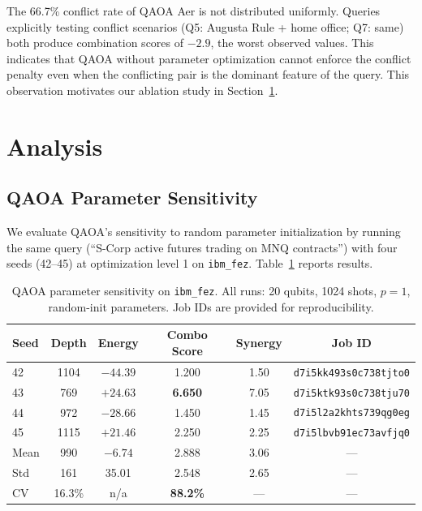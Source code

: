 \documentclass{article}
\begin{document}
The 66.7\% conflict rate of QAOA Aer is not distributed uniformly.
Queries explicitly testing conflict scenarios (Q5: Augusta Rule +
home office; Q7: same) both produce combination scores of $-2.9$,
the worst observed values. This indicates that QAOA without parameter
optimization cannot enforce the conflict penalty even when the
conflicting pair is the dominant feature of the query. This observation
motivates our ablation study in Section~\ref{sec:analysis}.

\section{Analysis}
\label{sec:analysis}

\subsection{QAOA Parameter Sensitivity}

We evaluate QAOA's sensitivity to random parameter initialization by
running the same query (``S-Corp active futures trading on MNQ
contracts'') with four seeds (42–45) at optimization level 1 on
\texttt{ibm\_fez}. Table~\ref{tab:sensitivity} reports results.

\begin{table}[h]
\centering
\caption{QAOA parameter sensitivity on \texttt{ibm\_fez}.
All runs: 20 qubits, 1024 shots, $p=1$, random-init parameters.
Job IDs are provided for reproducibility.}
\label{tab:sensitivity}
\small
\begin{tabular}{lccccc}
\toprule
Seed & Depth & Energy & Combo Score & Synergy & Job ID \\
\midrule
42 & 1104 & $-44.39$ & 1.200 & 1.50 & \texttt{d7i5kk493s0c738tjto0} \\
43 & 769  & $+24.63$ & \textbf{6.650} & 7.05 & \texttt{d7i5ktk93s0c738tju70} \\
44 & 972  & $-28.66$ & 1.450 & 1.45 & \texttt{d7i5l2a2khts739qg0eg} \\
45 & 1115 & $+21.46$ & 2.250 & 2.25 & \texttt{d7i5lbvb91ec73avfjq0} \\
\midrule
Mean & 990 & $-6.74$ & 2.888 & 3.06 & — \\
Std & 161 & 35.01 & 2.548 & 2.65 & — \\
CV & 16.3\% & n/a & \textbf{88.2\%} & — & — \\
\bottomrule
\end{tabular}
\end{table}
\end{document}
